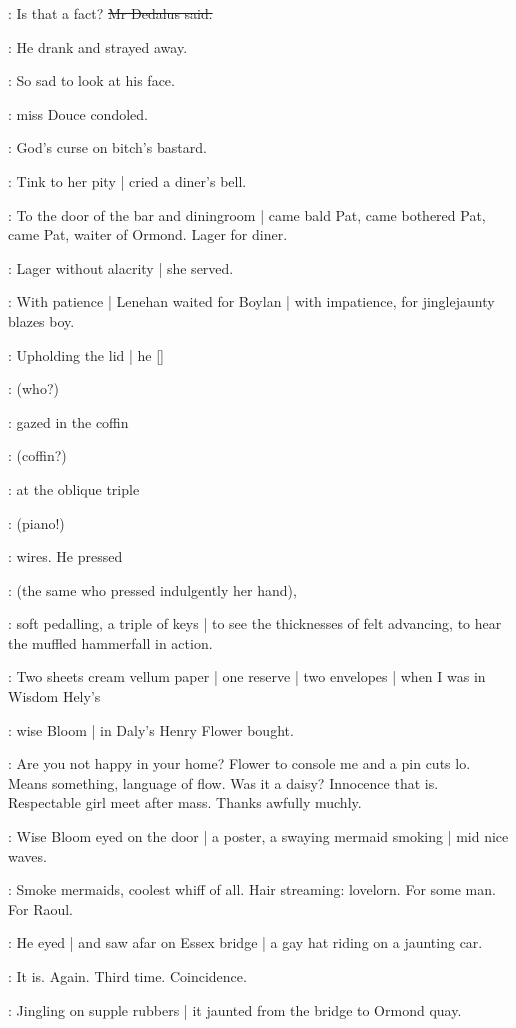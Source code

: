 \simon:
Is that a fact?
\sout{Mr Dedalus said.}

:
He drank and strayed away.

\MissD:
So sad to look at his face.

:
miss Douce condoled.

\stripling:
God's curse on bitch's bastard.

:
Tink to her pity |
cried a diner's bell.

:
To the door of the bar and diningroom |
came bald Pat,
came bothered Pat,
came Pat,
waiter of Ormond.
Lager for diner.

:
Lager without alacrity |
she served.

:
With patience  |
Lenehan waited for Boylan |
with impatience,
for jinglejaunty
blazes boy.

:
Upholding the lid |
he
[]

:
(who?)

:
gazed in the coffin

:
(coffin?)

:
at the oblique triple

:
(piano!)

:
wires.
He pressed

:
(the same who pressed indulgently her hand),

:
soft pedalling,
a triple of keys |
to see the thicknesses of felt advancing,
to hear the muffled hammerfall in action.

\BloomIntB:
Two sheets cream vellum paper |
one reserve |
two envelopes |
when I was
in Wisdom Hely's

:
wise Bloom |
in Daly's Henry Flower bought.

\BloomIntA:
Are you not happy in your home?
Flower to console me and a pin cuts lo.
Means something,
language of flow.
Was it a daisy?
Innocence that is.
Respectable girl meet after mass.
Thanks awfully muchly.

:
Wise Bloom eyed on the door |
a poster,
a swaying mermaid smoking |
mid nice waves.

\BloomIntA:
Smoke mermaids,
coolest whiff of all.
Hair streaming:
lovelorn.
For some man.
For Raoul.

:
He eyed |
and saw afar on Essex bridge |
a gay hat riding on a jaunting car.

\BloomIntA:
It is.
Again.
Third time.
Coincidence.

:
Jingling on supple rubbers |
it jaunted from the bridge to Ormond quay.

